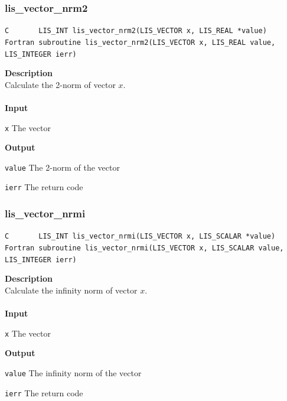 \documentclass[a4paper]{article}
\newcommand{\namelistlabel}[1]{\mbox{#1}\hfill}
\newenvironment{namelist}[1]{%
\begin{list}{}
  {\let\makelabel\namelistlabel
  \settowidth{\labelwidth}{#1}
  \setlength{\leftmargin}{1.1\labelwidth}}
  }{%
\end{list}}
\begin{document}
\subsubsection{lis\_vector\_nrm2}
\begin{screen}
\verb|C       LIS_INT lis_vector_nrm2(LIS_VECTOR x, LIS_REAL *value)|\\
\verb|Fortran subroutine lis_vector_nrm2(LIS_VECTOR x, LIS_REAL value, LIS_INTEGER ierr)|
\end{screen}
{\bf Description}\\
\indent
Calculate the 2-norm of vector $x$.
\\ \\
\noindent
{\bf Input}
\begin{namelist}{XXXXXXXXXXXXXXXXXXXX}
\item[\tt x] The vector
\end{namelist}
{\bf Output}
\begin{namelist}{XXXXXXXXXXXXXXXXXXXX}
\item[\tt value] The 2-norm of the vector
\item[\tt ierr] The return code
\end{namelist}

\newpage
\subsubsection{lis\_vector\_nrmi}
\begin{screen}
\verb|C       LIS_INT lis_vector_nrmi(LIS_VECTOR x, LIS_SCALAR *value)|\\
\verb|Fortran subroutine lis_vector_nrmi(LIS_VECTOR x, LIS_SCALAR value, LIS_INTEGER ierr)|
\end{screen}
{\bf Description}\\
\indent
Calculate the infinity norm of vector $x$.
\\ \\
\noindent
{\bf Input}
\begin{namelist}{XXXXXXXXXXXXXXXXXXXX}
\item[\tt x] The vector
\end{namelist}
{\bf Output}
\begin{namelist}{XXXXXXXXXXXXXXXXXXXX}
\item[\tt value] The infinity norm of the vector
\item[\tt ierr] The return code
\end{namelist}
\end{document}
